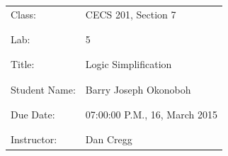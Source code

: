 \documentclass[9pt]{article}
\begin{document}
\vspace*{\fill}
\begin{center}
{\Huge \begin{tabular}{@{}ll@{}}
   Class: & CECS 201, Section 7 \\ \\ \\
   Lab: & 5 \\ \\ \\
   Title: & Logic Simplification \\ \\ \\
   Student Name: & Barry Joseph Okonoboh \\ \\ \\
   Due Date: & 07:00:00 P.M., 16, March 2015 \\ \\ \\
   Instructor: & Dan Cregg
\end{tabular}}
\end{center}
\vspace*{\fill}
\newpage
\end{document}

